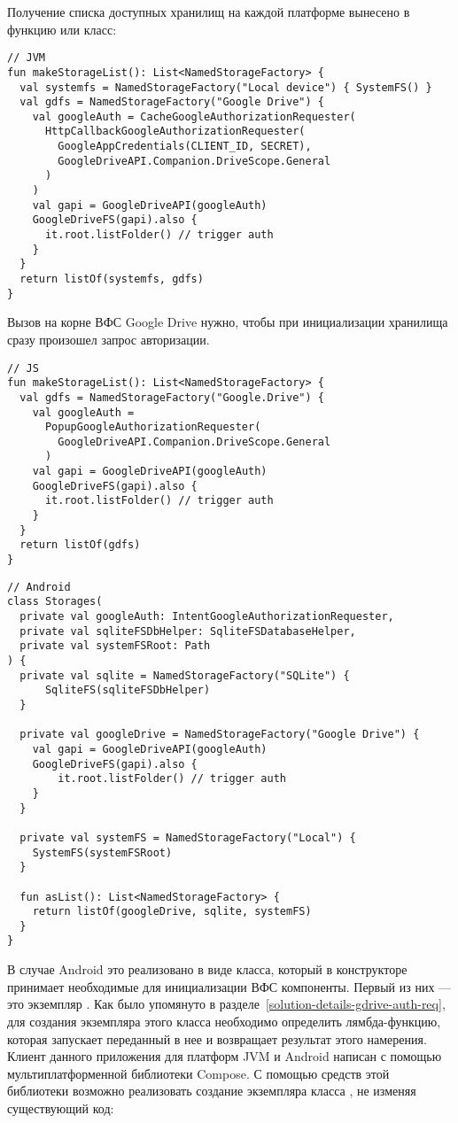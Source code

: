     Получение списка доступных хранилищ на каждой платформе вынесено в функцию или класс:
    \begin{verbatim}
// JVM
fun makeStorageList(): List<NamedStorageFactory> {
  val systemfs = NamedStorageFactory("Local device") { SystemFS() }
  val gdfs = NamedStorageFactory("Google Drive") {
    val googleAuth = CacheGoogleAuthorizationRequester(
      HttpCallbackGoogleAuthorizationRequester(
        GoogleAppCredentials(CLIENT_ID, SECRET),
        GoogleDriveAPI.Companion.DriveScope.General
      )
    )
    val gapi = GoogleDriveAPI(googleAuth)
    GoogleDriveFS(gapi).also {
      it.root.listFolder() // trigger auth
    }
  }
  return listOf(systemfs, gdfs)
}
    \end{verbatim}
    Вызов  на корне ВФС Google Drive нужно, чтобы при инициализации хранилища сразу произошел запрос авторизации.
    \begin{verbatim}
// JS
fun makeStorageList(): List<NamedStorageFactory> {
  val gdfs = NamedStorageFactory("Google.Drive") {
    val googleAuth =
      PopupGoogleAuthorizationRequester(
        GoogleDriveAPI.Companion.DriveScope.General
      )
    val gapi = GoogleDriveAPI(googleAuth)
    GoogleDriveFS(gapi).also {
      it.root.listFolder() // trigger auth
    }
  }
  return listOf(gdfs)
}
    \end{verbatim}
    \begin{verbatim}
// Android
class Storages(
  private val googleAuth: IntentGoogleAuthorizationRequester,
  private val sqliteFSDbHelper: SqliteFSDatabaseHelper,
  private val systemFSRoot: Path
) {
  private val sqlite = NamedStorageFactory("SQLite") {
      SqliteFS(sqliteFSDbHelper)
  }

  private val googleDrive = NamedStorageFactory("Google Drive") {
    val gapi = GoogleDriveAPI(googleAuth)
    GoogleDriveFS(gapi).also {
        it.root.listFolder() // trigger auth
    }
  }

  private val systemFS = NamedStorageFactory("Local") {
    SystemFS(systemFSRoot)
  }

  fun asList(): List<NamedStorageFactory> {
    return listOf(googleDrive, sqlite, systemFS)
  }
}
    \end{verbatim}
    В случае Android это реализовано в виде класса, который в конструкторе принимает необходимые для инициализации ВФС компоненты. Первый из них --- это экземпляр . Как было упомянуто в разделе~\ref{solution-details-gdrive-auth-req}, для создания экземпляра этого класса необходимо определить лямбда-функцию, которая запускает переданный в нее  и возвращает результат этого намерения. Клиент данного приложения для платформ JVM и Android написан с помощью мультиплатформенной библиотеки Compose\cite{gh-compose-jb}. С помощью средств этой библиотеки возможно реализовать создание экземпляра класса , не изменяя существующий код:
